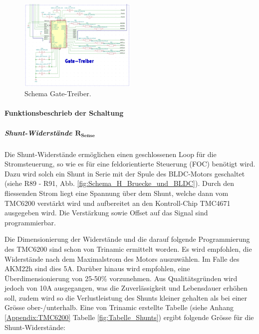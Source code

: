 \begin{figure}[h!]
	\centering
	\includegraphics[width=0.5\textwidth]{graphics/Schema_Gate_Treiber}
	\caption{Schema Gate-Treiber.}
	\label{fig:Schema_Gate_Treiber}
\end{figure}

\paragraph{Funktionsbeschrieb der Schaltung}\mbox{}

\subparagraph{Shunt-Widerstände $\mathrm{\mathbf{R_{Sense}}}$}
Die Shunt-Widerstände ermöglichen einen geschlossenen Loop für die Stromsteuerung, so wie es für eine feldorientierte Steuerung (FOC) benötigt wird. Dazu wird solch ein Shunt in Serie mit der Spule des BLDC-Motors geschaltet (siehe R89 - R91, Abb. \ref{fig:Schema_H_Bruecke_und_BLDC}). Durch den fliessenden Strom liegt eine Spannung über dem Shunt, welche dann vom TMC6200 verstärkt wird und aufbereitet an den Kontroll-Chip TMC4671 ausgegeben wird. Die Verstärkung sowie Offset auf das Signal sind programmierbar.

Die Dimensionierung der Widerstände und die darauf folgende Programmierung des TMC6200 sind schon von Trinamic ermittelt worden. Es wird empfohlen, die Widerstände nach dem Maximalstrom des Motors auszuwählen. Im Falle des AKM22h sind dies 5A. Darüber hinaus wird empfohlen, eine Überdimensionierung von 25-50\% vorzunehmen. Aus Qualitätsgründen wird jedoch von 10A ausgegangen, was die Zuverlässigkeit und Lebensdauer erhöhen soll, zudem wird so die Verlustleistung des Shunts kleiner gehalten als bei einer Grösse ober-/unterhalb. Eine von Trinamic erstellte Tabelle (siehe Anhang \ref{Appendix:TMC6200} Tabelle \ref{fig:Tabelle_Shunts}) ergibt folgende Grösse für die Shunt-Widerstände: \cite[S.31]{trinamic_tmc6200_datasheet_2013}

